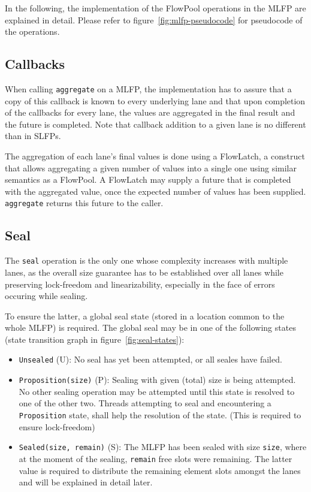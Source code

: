 \documentclass[runningheads,a4paper,fleqn]{llncs}
\begin{document}
In the following, the implementation of the FlowPool operations in the
MLFP are explained in detail. Please refer to
figure~\ref{fig:mlfp-pseudocode} for pseudocode of the operations.

\subsection{Callbacks}
When calling \verb+aggregate+ on a MLFP, the implementation has to
assure that a copy of this callback is known to every underlying lane
and that upon completion of the callbacks for every lane, the values
are aggregated in the final result and the future is completed. Note
that callback addition to a given lane is no different than in SLFPs.

The aggregation of each lane's final values is done using a FlowLatch,
a construct that allows aggregating a given number of values into a
single one using similar semantics as a FlowPool. A FlowLatch may
supply a future that is completed with the aggregated value, once the
expected number of values has been supplied. \verb+aggregate+ returns
this future to the caller.

\subsection{Seal}
The \verb+seal+ operation is the only one whose complexity increases
with multiple lanes, as the overall size guarantee has to be
established over all lanes while preserving lock-freedom and
linearizability, especially in the face of errors occuring while
sealing.

To ensure the latter, a global seal state (stored in a location common
to the whole MLFP) is required. The global seal may be in one of the
following states (state transition graph in
figure~\ref{fig:seal-states}):
\begin{itemize}
\item \verb+Unsealed+ (U): No seal has yet been attempted, or all
  seales have failed.
\item \verb+Proposition(size)+ (P): Sealing with given (total) size is
  being attempted. No other sealing operation may be attempted until
  this state is resolved to one of the other two. Threads attempting
  to seal and encountering a \verb+Proposition+ state, shall help the
  resolution of the state. (This is required to ensure lock-freedom)
\item \verb+Sealed(size, remain)+ (S): The MLFP has been sealed with
  size \verb+size+, where at the moment of the sealing, \verb+remain+
  free slots were remaining. The latter value is required to
  distribute the remaining element slots amongst the lanes and will be
  explained in detail later.
\end{itemize}
\end{document}
